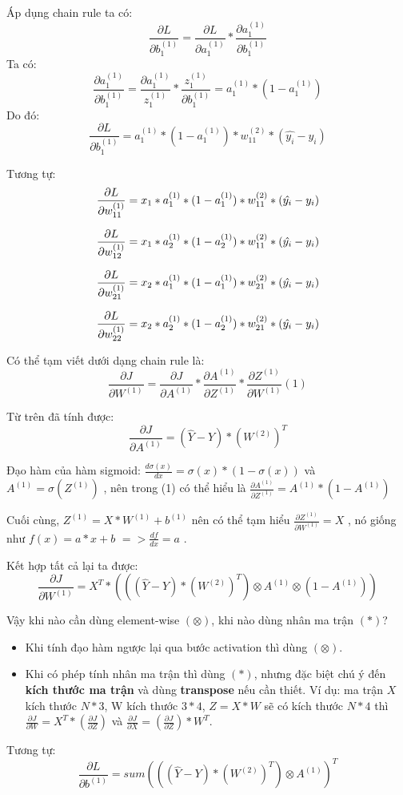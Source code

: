Áp dụng chain rule ta có: $$ \frac{\partial L}{\partial b_1^{(1)}} = \frac{\partial L}{\partial a_1^{(1)}} * \frac{\partial a_1^{(1)}}{\partial b_1^{(1)} }$$
Ta có:
$$\frac{\partial a_1^{(1)}}{\partial b_1^{(1)}} = \frac{\partial a_1^{(1)}}{z_1^{(1)}} * \frac{z_1^{(1)}}{\partial b_1^{(1)}} = a_1^{(1)} * (1 - a_1^{(1)})$$
Do đó:
$$\frac{\partial L}{\partial b_1^{(1)}} = a_1 ^ {(1)} * (1 - a_1^{(1)}) * w_{11}^{(2)} * (\hat{y_i} - y_i)$$

Tương tự:
$$\frac{\partial L}{\partial w_{11}^{(1)}} = x_1 * a_1 ^ {(1)} * (1 - a_1^{(1)}) * w_{11}^{(2)} *  (\hat{y_i} - y_i)  \newline$$

$$\frac{\partial L}{\partial w_{12}^{(1)}} = x_1 * a_2 ^ {(1)} * (1 - a_2^{(1)}) * w_{11}^{(2)} *  (\hat{y_i} - y_i)  \newline$$

$$\frac{\partial L}{\partial w_{21}^{(1)}} = x_2 * a_1 ^ {(1)} * (1 - a_1^{(1)}) * w_{21}^{(2)} *  (\hat{y_i} - y_i)  \newline $$

$$\frac{\partial L}{\partial w_{22}^{(1)}} = x_2 * a_2^ {(1)} * (1 - a_2^{(1)}) * w_{21}^{(2)} *  (\hat{y_i} - y_i)  \newline$$

Có thể tạm viết dưới dạng chain rule là: $$\frac{\partial J}{\partial W^{(1)}} = \frac{\partial J}{\partial A^{(1)}} * \frac{\partial A^{(1)}}{\partial Z^{(1)}}* \frac{\partial Z^{(1)}}{\partial W^{(1)}} (1) $$

Từ trên đã tính được: $$\frac{\partial J}{\partial A^{(1)}} = (\hat{Y} - Y) * (W^{(2)})^T$$

Đạo hàm của hàm sigmoid: $\frac{d\sigma(x)}{dx} = \sigma(x) * (1 - \sigma(x))$ và $A^{(1)} = \sigma(Z^{(1)})$ , nên trong (1) có thể hiểu là $\frac{\partial A^{(1)}}{\partial Z^{(1)}} = A^{(1)}* (1 - A^{(1)})$

Cuối cùng, $Z^{(1)} = X * W^{(1)} + b^{(1)}$ nên có thể tạm hiểu $\frac{\partial Z^{(1)}}{\partial W^{(1)}} = X$ , nó giống như $f(x)= a*x +b$ $ => \frac{df}{dx} = a$ .

Kết hợp tất cả lại ta được:
$$\frac{\partial J}{\partial W^{(1)}} = X^T * (((\hat{Y} - Y) * (W^{(2)})^T)\otimes A^{(1)}\otimes (1-A^{(1)}) ) $$

Vậy khi nào cần dùng element-wise $(\otimes)$, khi nào dùng nhân ma trận $(*)$?
\begin{itemize}
\item Khi tính đạo hàm ngược lại qua bước activation thì dùng $(\otimes)$.
\item Khi có phép tính nhân ma trận thì dùng $(*)$, nhưng đặc biệt chú ý đến \textbf{kích thước ma trận} và dùng \textbf{transpose} nếu cần thiết. Ví dụ: ma trận $X$ kích thước $N*3$, W kích thước $3*4$, $Z = X * W$ sẽ có kích thước $N*4$ thì $\frac{\partial J}{\partial W} = X^T * (\frac{\partial J}{\partial Z})$ và $\frac{\partial J}{\partial X} = (\frac{\partial J}{\partial Z}) * W^T$.
\end{itemize}
Tương tự: $$\frac{\partial L}{\partial b^{(1)}} = sum(((\hat{Y} - Y) * (W^{(2)})^T)\otimes A^{(1)})^T$$

